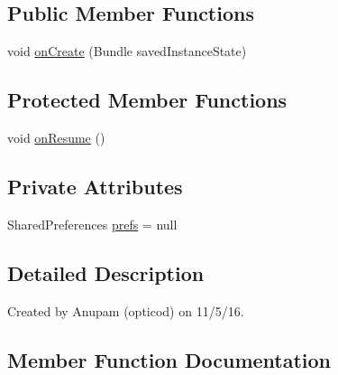 \subsection*{Public Member Functions}
\begin{DoxyCompactItemize}
\item 
void \hyperlink{classorg_1_1buildmlearn_1_1videocollection_1_1activities_1_1SplashActivity_a0e4266fad2ec7ca5bdbc4560269fbb60}{on\+Create} (Bundle saved\+Instance\+State)
\end{DoxyCompactItemize}
\subsection*{Protected Member Functions}
\begin{DoxyCompactItemize}
\item 
void \hyperlink{classorg_1_1buildmlearn_1_1videocollection_1_1activities_1_1SplashActivity_a6f29fdbd93459d5b28bd7d54bd7c885c}{on\+Resume} ()
\end{DoxyCompactItemize}
\subsection*{Private Attributes}
\begin{DoxyCompactItemize}
\item 
Shared\+Preferences \hyperlink{classorg_1_1buildmlearn_1_1videocollection_1_1activities_1_1SplashActivity_a22112929f7a1c80ecf767153f0c7fdad}{prefs} = null
\end{DoxyCompactItemize}


\subsection{Detailed Description}
Created by Anupam (opticod) on 11/5/16. 

\subsection{Member Function Documentation}
